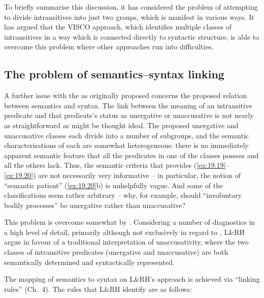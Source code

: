 \documentclass[output=paper]{langsci/langscibook}
\begin{document}
To briefly summarise this discussion, it has considered the problem of
attempting to divide intransitives into just two groups, which is manifest in
various ways. It has argued that the VISCO approach, which identifies multiple
classes of intransitives in a way which is connected directly to syntactic
structure, is able to overcome this problem where other approaches run into
difficulties.

\subsection{The problem of semantics--syntax linking}\label{sec:baker:3.5}

A further issue with the  as originally proposed
concerns the proposed relation between semantics and syntax. The link between
the meaning of an intransitive predicate and that predicate’s status as
unergative or unaccusative is not nearly as straightforward as might be thought
ideal. The proposed unergative and unaccusative classes each divide into a
number of subgroups, and the semantic characterisations of each are somewhat
heterogeneous: there is no immediately apparent semantic feature that all the
predicates in one of the classes possess and all the others lack. Thus, the
semantic criteria that \citet{Perlmutter1978} provides
(\ref{ex:19.19}--\ref{ex:19.20}) are not necessarily very informative
– in particular, the notion of \enquote{semantic patient} (\ref{ex:19.20}b) is
unhelpfully vague. And some of the classifications seem rather arbitrary – why,
for example, should \enquote{involuntary bodily processes} be
unergative rather than unaccusative?

This problem is overcome somewhat by \citet{LevinRappaportHovav1995}.
Considering a number of diagnostics in a high level of detail, primarily
although not exclusively in regard to , L\&RH argue in favour of a
traditional interpretation of unaccusativity, where the two classes of
intransitive predicates (unergative and unaccusative) are both semantically
determined and syntactically represented.

The mapping of semantics to syntax on L\&RH’s approach is achieved via
\enquote{linking rules} (Ch.\ 4). The rules that L\&RH identify are as follows:
\end{document}
